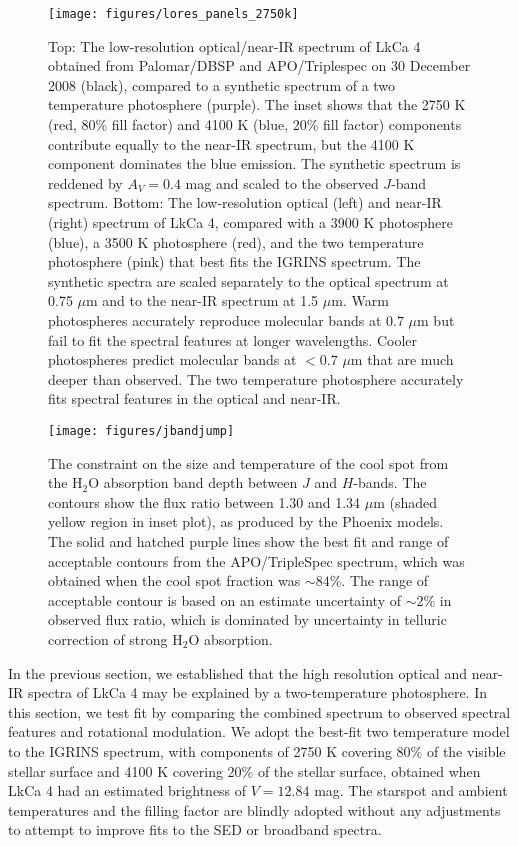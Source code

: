 \documentclass[twocolumn]{emulateapj}%
\begin{document}
\begin{figure*}
 \centering
 \texttt{[image: figures/lores\_panels\_2750k]}
 \caption{Top:  The low-resolution optical/near-IR spectrum of LkCa 4 obtained from Palomar/DBSP and APO/Triplespec on 30 December 2008 (black), compared to a synthetic spectrum of a two temperature photosphere (purple).  The inset shows that the 2750 K (red, 80\% fill factor) and 4100 K (blue, 20\% fill factor) components contribute equally to the near-IR spectrum, but the 4100 K component dominates the blue emission.  The synthetic spectrum is reddened by $A_V=0.4$ mag and scaled to the observed $J$-band spectrum. Bottom:  The low-resolution optical (left) and near-IR (right) spectrum of LkCa 4, compared with a 3900 K photosphere (blue), a 3500 K photosphere (red), and the two temperature photosphere (pink) that best fits the IGRINS spectrum.  The synthetic spectra are scaled separately to the optical spectrum at 0.75 $\mu$m and to the near-IR spectrum at 1.5 $\mu$m.  Warm photospheres accurately reproduce molecular bands at $0.7$ $\mu$m but fail to fit the spectral features at longer wavelengths.  Cooler photospheres predict molecular bands at $<0.7$ $\mu$m that are much deeper than observed.  The two temperature photosphere accurately fits spectral features in the optical and near-IR.}
 \label{fig:lores}
\end{figure*}


\begin{figure}
 \centering
\texttt{[image: figures/jbandjump]}
\caption{The constraint on the size and temperature of the cool spot from the H$_2$O absorption band depth between $J$ and $H$-bands.  The contours show the flux ratio between 1.30 and 1.34 $\mu$m (shaded yellow region in inset plot), as produced by the Phoenix models.  The solid and hatched purple lines show the best fit and range of acceptable contours from the APO/TripleSpec spectrum, which was obtained when the cool spot fraction was $\sim 84$\%.  The range of acceptable contour is based on an estimate uncertainty of $\sim 2$\% in observed flux ratio, which is dominated by uncertainty in telluric correction of strong H$_2$O absorption. }
 \label{fig:h2ojump}
\end{figure}


In the previous section, we established that the high resolution optical and near-IR spectra of LkCa 4 may be explained by a two-temperature photosphere.  In this section, we test fit by comparing the combined spectrum to observed spectral features and rotational modulation.  We adopt the best-fit two temperature model to the IGRINS spectrum, with components of 2750 K covering 80\% of the visible stellar surface and 4100 K covering 20\% of the stellar surface, obtained when LkCa 4 had an estimated brightness of $V=12.84$ mag.  The starspot and ambient temperatures and the filling factor are blindly adopted without any adjustments to attempt to improve fits to the SED or broadband spectra.
\end{document}
